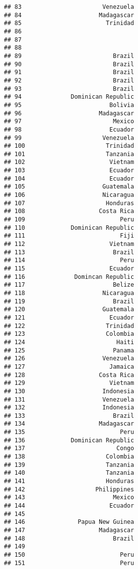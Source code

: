 \documentclass[
]{article}
\begin{document}
\begin{verbatim}
## 83                       Venezuela
## 84                      Madagascar
## 85                        Trinidad
## 86                                
## 87                                
## 88                                
## 89                          Brazil
## 90                          Brazil
## 91                          Brazil
## 92                          Brazil
## 93                          Brazil
## 94              Dominican Republic
## 95                         Bolivia
## 96                      Madagascar
## 97                          Mexico
## 98                         Ecuador
## 99                       Venezuela
## 100                       Trinidad
## 101                       Tanzania
## 102                        Vietnam
## 103                        Ecuador
## 104                        Ecuador
## 105                      Guatemala
## 106                      Nicaragua
## 107                       Honduras
## 108                     Costa Rica
## 109                           Peru
## 110             Dominican Republic
## 111                           Fiji
## 112                        Vietnam
## 113                         Brazil
## 114                           Peru
## 115                        Ecuador
## 116              Domincan Republic
## 117                         Belize
## 118                      Nicaragua
## 119                         Brazil
## 120                      Guatemala
## 121                        Ecuador
## 122                       Trinidad
## 123                       Colombia
## 124                          Haiti
## 125                         Panama
## 126                      Venezuela
## 127                        Jamaica
## 128                     Costa Rica
## 129                        Vietnam
## 130                      Indonesia
## 131                      Venezuela
## 132                      Indonesia
## 133                         Brazil
## 134                     Madagascar
## 135                           Peru
## 136             Dominican Republic
## 137                          Congo
## 138                       Colombia
## 139                       Tanzania
## 140                       Tanzania
## 141                       Honduras
## 142                    Philippines
## 143                         Mexico
## 144                        Ecuador
## 145                               
## 146               Papua New Guinea
## 147                     Madagascar
## 148                         Brazil
## 149                               
## 150                           Peru
## 151                           Peru

\end{verbatim}
\end{document}

